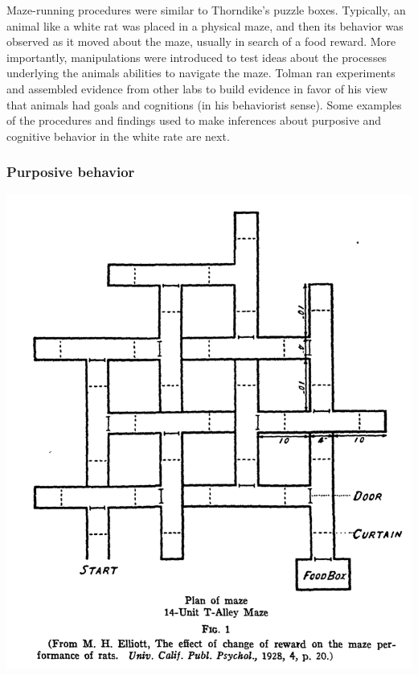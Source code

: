 \documentclass[
  oneside,
  12pt]{crumpbook}
\newenvironment{floatrightbox50}{%
  \wrapfigure{R}{.5\textwidth}%
  }{%
  \endwrapfigure}
\begin{document}
Maze-running procedures were similar to Thorndike's puzzle boxes. Typically, an animal like a white rat was placed in a physical maze, and then its behavior was observed as it moved about the maze, usually in search of a food reward. More importantly, manipulations were introduced to test ideas about the processes underlying the animals abilities to navigate the maze. Tolman ran experiments and assembled evidence from other labs to build evidence in favor of his view that animals had goals and cognitions (in his behaviorist sense). Some examples of the procedures and findings used to make inferences about purposive and cognitive behavior in the white rate are next.

\hypertarget{purposive-behavior}{%
\subsubsection{Purposive behavior}\label{purposive-behavior}}

\begin{floatrightbox50}
\includegraphics[width=1\linewidth]{imgs/Tolman_AlleyMaze}

\end{floatrightbox50}
\end{document}
